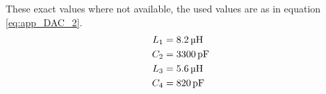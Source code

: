 These exact values where not available, the used values are as in equation \ref{eq:app_DAC_2}.
\begin{equation}
    \label{eq:app_DAC_2}
    \begin{split}
        L_1 &= \SIQ{8.2}{\micro\henry}\\
        C_2 &= \SIQ{3300}{\pico\farad} \\
        L_3 &= \SIQ{5.6}{\micro\henry}\\
        C_4 &= \SIQ{820}{\pico\farad} \\
    \end{split}
    \end{equation}



